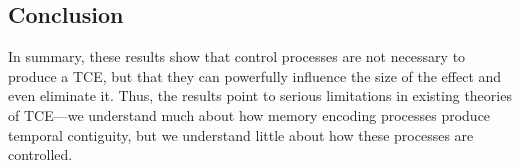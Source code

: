 \documentclass[man,natbib,floatsintext]{apa6} %
\begin{document}
\subsection{Conclusion}

In summary, these results show that control processes are not necessary to produce a TCE, but that they can powerfully influence the size of the effect and even eliminate it. Thus, the results point to serious limitations in existing theories of TCE---we understand much about how memory encoding processes produce temporal contiguity, but we understand little about how these processes are controlled.


\end{document}
